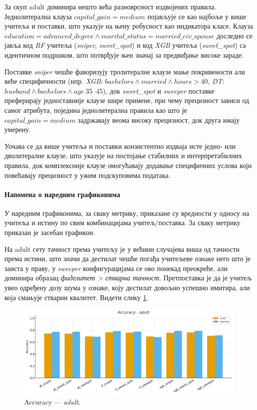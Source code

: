 За скуп adult доминира нешто већа разноврсност издвојених правила. Једнолитерална клауза $capital\_gain=medium$ појављује се као најбоље у више учитеља и поставки, што указује на њену робусност као индикатора класе. Клауза $education=advanced\_degree \land marital\_status=married\_civ\_spouse$ доследно се јавља код \textit{RF} учитеља (\textit{sniper}, \textit{sweet\_spot}) и код \textit{XGB} учитеља (\textit{sweet\_spot}) са идентичном подршком, што потврђује њен значај за предвиђање високе зараде.

Поставке \textit{sniper} чешће фаворизују тролитералне клаузе мање покривености али веће специфичности (нпр. \textit{XGB}: $bachelors \land married \land hours>40$, \textit{DT}: $husband \land bachelors \land age\ 35–45$), док \textit{sweet\_spot} и \textit{sweeper} поставке преферирају једноставније клаузе шире примене, при чему прецизност зависи од самог атрибута, поједина једнолитерална правила као што је $capital\_gain = medium$ задржавају веома високу прецизност, док друга имају умерену.


Уочава се да више учитеља и поставки конзистентно издваја исте једно- или дволитералне клаузе, што указује на постојање стабилних и интерпретабилних правила, док комплексније клаузе омогућавају додавање специфичних услова који повећавају прецизност у ужим подскуповима података.

\paragraph{Напомена о наредним графиконима} У наредним графиконима, за сваку метрику, приказане су вредности у односу на учитеља и истину по свим комбинацијама учитељ/поставка. За сваку метрику приказан је засебан графикон.


На adult сету тачност према учитељу је у већини случајева виша од тачности према истини, што значи да дестилат чешће погађа учитељеве ознаке него што је заиста у праву, у \textit{sweeper} конфигурацијама се ово понекад преокреће, али доминира образац \emph{фиделитет > стварна тачност}. Претпоставка је да је учитељ увео одређену дозу шума у ознаке, коју дестилат довољно успешно имитира, али која смањује стварни квалитет. Видети слику \ref{fig:adult-acc}.
\begin{figure}[H]
  \centering
  \includegraphics[width=.85\linewidth]{images/charts/accuracy_simple_adult.png}
  \caption{Accuracy — \textit{adult}.}
  \label{fig:adult-acc}
\end{figure}

